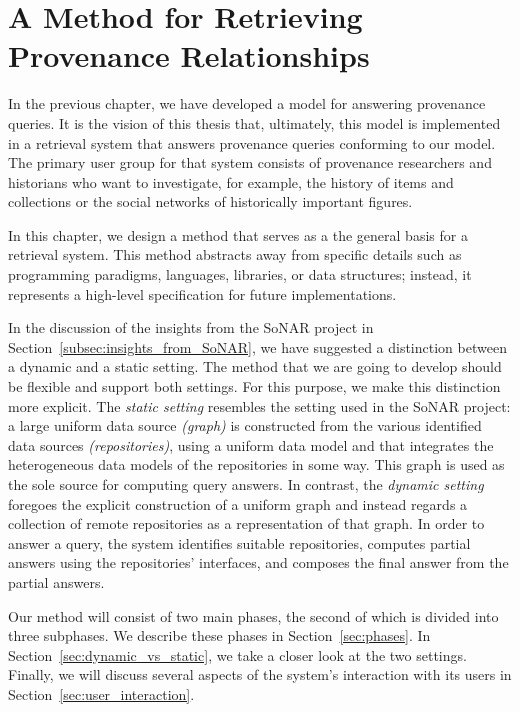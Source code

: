\chapter{A Method for Retrieving Provenance Relationships}
\label{chap:retrieval}
\label{chap:method}

In the previous chapter, 
we have developed a model for answering provenance queries.
It is the vision of this thesis that, ultimately,
this model is implemented 
in a retrieval system
that answers provenance queries conforming to our model.
The primary user group for that system consists of provenance researchers
and historians who want to investigate, for example, the history of
items and collections or the social networks of historically important figures.

In this chapter, we design a method that serves
as a the general basis for a retrieval system.
This method abstracts away from specific details such as 
programming paradigms, languages, libraries, or data structures;
instead, it represents a high-level specification
for future implementations.

In the discussion of the insights from the \gls{SoNAR} project
in Section~\ref{subsec:insights_from_SoNAR},
we have suggested a distinction between a dynamic and a static setting.
The method that we are going to develop should be flexible
and support both settings.
For this purpose, we make this distinction more explicit.
The \emph{static setting} resembles the setting used in the SoNAR project:
a large uniform data source \emph{(graph)} is constructed
from the various identified data sources \emph{(repositories)},
using a uniform data model and that integrates the heterogeneous data models
of the repositories in some way. This graph is 
used as the sole source for computing query answers.
In contrast, the \emph{dynamic setting} foregoes
the explicit construction of a uniform graph and instead
regards a collection of remote repositories as a representation of that
graph. In order to answer a query, the system identifies
suitable repositories, computes partial answers using the repositories' interfaces,
and composes the final answer from the partial answers.

Our method will consist of two main phases, the second of which is divided
into three subphases.
We describe these phases in Section~\ref{sec:phases}.
In Section~\ref{sec:dynamic_vs_static}, we take a closer look at the two settings.
Finally, we will discuss several aspects of the system's interaction with its users
in Section~\ref{sec:user_interaction}.

